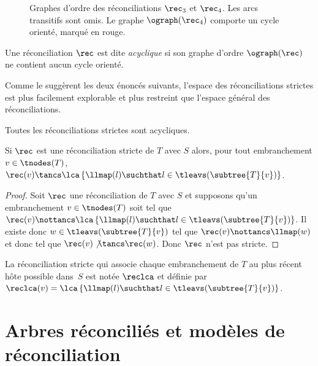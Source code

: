 \begin{figure}[htb]
    \capstart
    \centering
    
    \caption{
        Graphes d’ordre des réconciliations \(\rec_3\) et \(\rec_4\).
        Les arcs transitifs sont omis.
        Le graphe \(\ograph(\rec_4)\) comporte un cycle orienté, marqué en rouge.
    }
    \label{figure:order-graph}
\end{figure}

\begin{definition}\label{definition:rec-acyclic}
    Une réconciliation \(\rec\) est dite \emph{acyclique} si son graphe d’ordre \(\ograph(\rec)\) ne contient aucun cycle orienté.
\end{definition}

Comme le suggèrent les deux énoncés suivants, l’espace des réconciliations strictes est plus facilement explorable et plus restreint que l’espace général des réconciliations.

\begin{remark}
    Toutes les réconciliations strictes sont acycliques.
\end{remark}
\vspace{-.5em}
\begin{lemma}\label{lemma:strict-rec-space}
    Si \(\rec\) est une réconciliation stricte de \(T\) avec \(S\) alors, pour tout embranchement \(v \in \tnodes(T)\),
    \(\rec(v) \tancs \lca\left\{ \llmap(l) \suchthat l \in \tleavs(\subtree{T}{v}) \right\}\).
\end{lemma}
\vspace{-1em}
\begin{proof}
    Soit \(\rec\) une réconciliation de \(T\) avec \(S\) et supposons qu’un embranchement \(v \in \tnodes(T)\) soit tel que
    \(\rec(v) \nottancs \lca\left\{ \llmap(l) \suchthat l \in \tleavs(\subtree{T}{v}) \right\}\).
    Il existe donc \(w \in \tleavs(\subtree{T}{v})\) tel que \(\rec(v) \nottancs \llmap(w)\)
    et donc tel que \(\rec(v) \not\tancs \rec(w)\).
    Donc \(\rec\) n’est pas stricte.
\end{proof}

\vspace{-.5em}
La réconciliation stricte qui associe chaque embranchement de \(T\) au plus récent hôte possible dans~\(S\) est notée \(\reclca\) et définie par \(
    \reclca(v) = \lca\left\{ \llmap(l) \suchthat l \in \tleavs(\subtree{T}{v}) \right\}
\).

\section{Arbres réconciliés et modèles de réconciliation}

